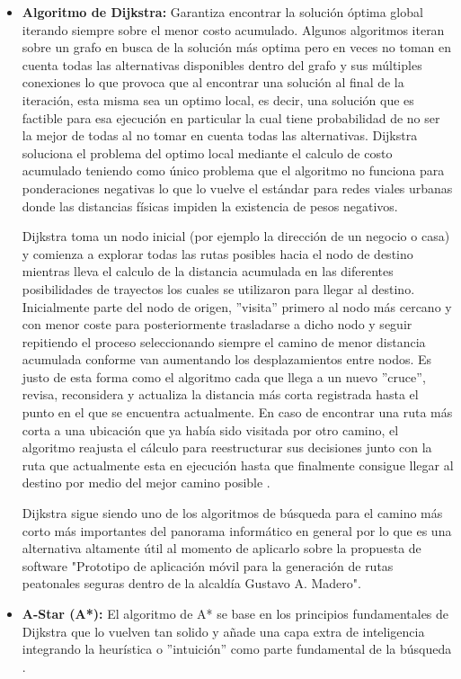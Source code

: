 \begin{itemize}
    \item \textbf{Algoritmo de Dijkstra:} Garantiza encontrar la solución óptima global iterando siempre sobre el menor costo acumulado. Algunos algoritmos iteran sobre un grafo en busca de la solución más optima pero en veces no toman en cuenta todas las alternativas disponibles dentro del grafo y sus múltiples conexiones lo que provoca que al encontrar una solución al final de la iteración, esta misma sea un optimo local, es decir, una solución que es factible para esa ejecución en particular la cual tiene probabilidad de no ser la mejor de todas al no tomar en cuenta todas las alternativas. Dijkstra soluciona el problema del optimo local mediante el calculo de costo acumulado teniendo como único problema que el algoritmo no funciona para ponderaciones negativas lo que lo vuelve el estándar para redes viales urbanas donde las distancias físicas impiden la existencia de pesos negativos. 

    Dijkstra toma un nodo inicial (por ejemplo la dirección de un negocio o casa) y comienza a explorar todas las rutas posibles hacia el nodo de destino mientras lleva el calculo de la distancia acumulada en las diferentes posibilidades de trayectos los cuales se utilizaron para llegar al destino. Inicialmente parte del nodo de origen, ''visita'' primero al nodo más cercano y con menor coste para posteriormente trasladarse a dicho nodo y seguir repitiendo el proceso seleccionando siempre el camino de menor distancia acumulada conforme van aumentando los desplazamientos entre nodos. Es justo de esta forma como el algoritmo cada que llega a un nuevo ''cruce'', revisa, reconsidera y actualiza la distancia más corta registrada hasta el punto en el que se encuentra actualmente. En caso de encontrar una ruta más corta a una ubicación que ya había sido visitada por otro camino, el algoritmo reajusta el cálculo para reestructurar sus decisiones junto con la ruta que actualmente esta en ejecución hasta que finalmente consigue llegar al destino por medio del mejor camino posible \cite{dijkstra_udit}. 

    Dijkstra sigue siendo uno de los algoritmos de búsqueda para el camino más corto más importantes del panorama informático en general por lo que es una alternativa altamente útil al momento de aplicarlo sobre la propuesta de software "Prototipo de aplicación móvil para la generación de rutas peatonales seguras dentro de la alcaldía Gustavo A. Madero". 
    
    \item \textbf{A-Star (A*):} El algoritmo de A* se base en los principios fundamentales de Dijkstra que lo vuelven tan solido y añade una capa extra de inteligencia integrando la heurística o ''intuición'' como parte fundamental de la búsqueda \cite{dijkstra_udit}. 


\end{itemize}
